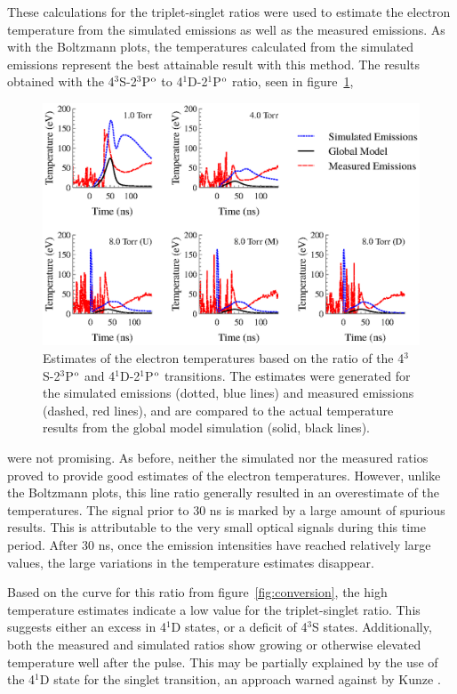 These calculations for the triplet-singlet ratios were used to estimate the
electron temperature from the simulated emissions as well as the measured
emissions. As with the Boltzmann plots, the temperatures calculated from the
simulated emissions represent the best attainable result with this method. The
results obtained with the 4$^3$S-2$^3$P$^\mathrm{o}$ to 4$^1$D-2$^1$P$^\mathrm{o}$ ratio, seen
in figure~\ref{fig:rat2comp},
\begin{figure}
  \centering
  \includegraphics{./chapters/emissions/figures/rat2comp.eps}
  \caption{Estimates of the electron temperatures based on the ratio of the
    4$^3$S-2$^3$P$^\mathrm{o}$ and 4$^1$D-2$^1$P$^\mathrm{o}$ transitions. The estimates were
    generated for the simulated emissions (dotted, blue lines) and measured
    emissions (dashed, red lines), and are compared to the actual temperature
    results from the global model simulation (solid, black lines).}
  \label{fig:rat2comp}
\end{figure}
were not promising. As before, neither the simulated nor the measured ratios
proved to provide good estimates of the electron temperatures. However, unlike
the Boltzmann plots, this line ratio generally resulted in an overestimate of
the temperatures. The signal prior to 30 ns is marked by a large amount of
spurious results. This is attributable to the very small optical signals during
this time period. After 30 ns, once the emission intensities have reached
relatively large values, the large variations in the temperature estimates
disappear.

Based on the curve for this ratio from figure~\ref{fig:conversion}, the high
temperature estimates indicate a low value for the triplet-singlet ratio. This
suggests either an excess in 4$^1$D states, or a deficit of 4$^3$S states.
Additionally, both the measured and simulated ratios show growing or otherwise
elevated temperature well after the pulse. This may be partially explained by
the use of the 4$^1$D state for the singlet transition, an approach warned
against by Kunze \cite{Kunze2009}.


